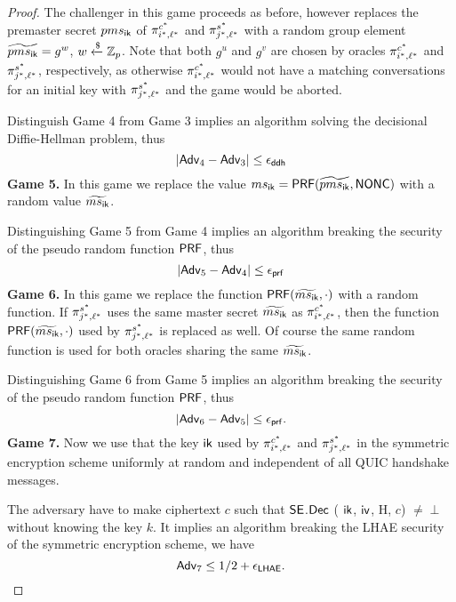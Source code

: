 \begin{proof}
 The challenger in this game proceeds as before, however replaces the premaster secret $pms_{\mathsf{ik}}$ of $\pi^{c^{\ast}}_{i^{\ast},\ell^{\ast}}$ and $\pi^{s^{\ast}}_{j^{\ast},\ell^{\ast}}$ with a random group element $\widetilde{pms_{\mathsf{ik}}} = g^w$, $w \xleftarrow{\$} \mathbb{Z}_p$. Note that both $g^u$ and $g^v$ are chosen by oracles $\pi^{c^{\ast}}_{i^{\ast},\ell^{\ast}}$ and $\pi^{s^{\ast}}_{j^{\ast},\ell^{\ast}}$, respectively, as otherwise $\pi^{c^{\ast}}_{i^{\ast},\ell^{\ast}}$ would not have a matching conversations for an initial key with $\pi^{s^{\ast}}_{j^{\ast},\ell^{\ast}}$ and the game would be aborted.

 Distinguish Game 4 from Game 3 implies an algorithm solving the decisional Diffie-Hellman problem, thus
 \begin{equation}
  |\mathsf{Adv}_{4} - \mathsf{Adv}_{3}| \leq \epsilon_{\mathsf{ddh}}
 \end{equation}%
%
%
 \textbf{Game 5.} In this game we replace the value $ms_{\mathsf{ik}} = \mathsf{PRF}(\widetilde{pms_{\mathsf{ik}}}, \mathsf{NONC})$ with a random value $\widetilde{ms_{\mathsf{ik}}}$.

 Distinguishing Game 5 from Game 4 implies an algorithm breaking the security of the pseudo random function $\mathsf{PRF}$, thus
 \begin{equation}
  |\mathsf{Adv}_{5} - \mathsf{Adv}_{4}| \leq \epsilon_{\mathsf{prf}}
 \end{equation}%
%
%
 \textbf{Game 6.} In this game we replace the function $\mathsf{PRF}(\widetilde{ms_{\mathsf{ik}}},\cdot)$ with a random function. If $\pi^{s^{\ast}}_{j^{\ast},\ell^{\ast}}$ uses the same master secret $\widetilde{ms_{\mathsf{ik}}}$ as $\pi^{c^{\ast}}_{i^{\ast},\ell^{\ast}}$, then the function $\mathsf{PRF}(\widetilde{ms_{\mathsf{ik}}},\cdot)$ used by $\pi^{s^{\ast}}_{j^{\ast},\ell^{\ast}}$ is replaced as well. Of course the same random function is used for both oracles sharing the same $\widetilde{ms_{\mathsf{ik}}}$.

 Distinguishing Game 6 from Game 5 implies an algorithm breaking the security of the pseudo random function $\mathsf{PRF}$, thus
 \begin{equation}
  |\mathsf{Adv}_6 - \mathsf{Adv}_5| \leq \epsilon_{\mathsf{prf}}.
 \end{equation}%
%
%
 \textbf{Game 7.} Now we use that the key $\mathsf{ik}$ used by $\pi^{c^{\ast}}_{i^{\ast},\ell^{\ast}}$ and $\pi^{s^{\ast}}_{j^{\ast},\ell^{\ast}}$ in the symmetric encryption scheme uniformly at random and independent of all QUIC handshake messages.

 The adversary have to make ciphertext $c$ such that $\mathsf{SE}$.$\mathsf{Dec}$ ( $\mathsf{ik}$, $\mathsf{iv}$, H, $c$) $\neq \perp$ without knowing the key $k$. It implies an algorithm breaking the LHAE security of the symmetric encryption scheme, we have
 \begin{equation}
  \mathsf{Adv}_7 \leq 1/2 + \epsilon_{\mathsf{LHAE}}.
 \end{equation}%
\end{proof}